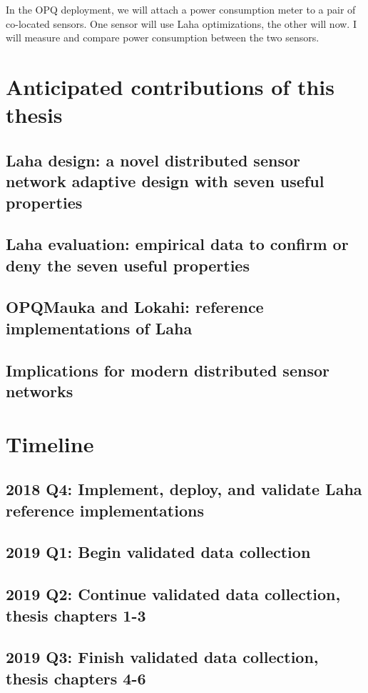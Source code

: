 In the OPQ deployment, we will attach a power consumption meter to a pair of co-located sensors. One sensor will use Laha optimizations, the other will now. I will measure and compare power consumption between the two sensors. 

\section{Anticipated contributions of this thesis}
\subsection{Laha design: a novel distributed sensor network adaptive design with seven useful properties}
\subsection{Laha evaluation: empirical data to confirm or deny the seven useful properties}
\subsection{OPQMauka and Lokahi: reference implementations of Laha}
\subsection{Implications for modern distributed sensor networks}

\section{Timeline}
\subsection{2018 Q4: Implement, deploy, and validate Laha reference implementations}
\subsection{2019 Q1: Begin validated data collection}
\subsection{2019 Q2: Continue validated data collection, thesis chapters 1-3}
\subsection{2019 Q3: Finish validated data collection, thesis chapters 4-6}





